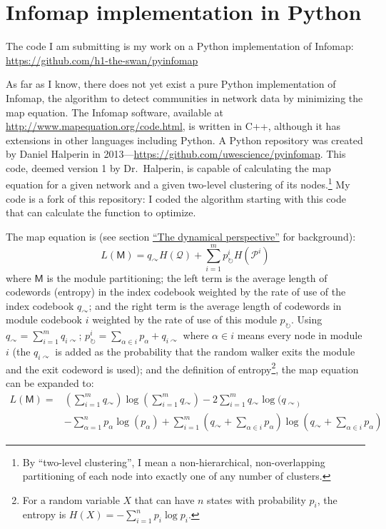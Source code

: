 \hypertarget{pyinfomap}{\section{Infomap implementation in
Python}\label{pyinfomap}}

\protect\hyperlink{pyinfomap}{}

The code I am submitting is my work on a Python implementation of
Infomap: \url{https://github.com/h1-the-swan/pyinfomap}

As far as I know, there does not yet exist a pure Python implementation
of Infomap, the algorithm to detect communities in network data by
minimizing the map equation. The Infomap software, available at
\url{http://www.mapequation.org/code.html}, is written in C++, although
it has extensions in other languages including Python. A Python
repository was created by Daniel Halperin in
2013---\url{https://github.com/uwescience/pyinfomap}. This code, deemed
version 1 by Dr.~Halperin, is capable of calculating the map equation
for a given network and a given two-level clustering of its
nodes.\footnote{By ``two-level clustering'', I mean a non-hierarchical,
  non-overlapping partitioning of each node into exactly one of any
  number of clusters.} My code is a fork of this repository: I coded the
algorithm starting with this code that can calculate the function to
optimize.

The map equation is (see section
\protect\hyperlink{the-dynamical-perspective}{``The dynamical
perspective''} for background):
\[L(\mathsf{M}) = q_{\curvearrowright} H(\mathcal{Q}) + \sum_{i=1}^{m}{p_{\circlearrowright}^{i} H(\mathcal{P}^i)}\]
where \(\mathsf{M}\) is the module partitioning; the left term is the
average length of codewords (entropy) in the index codebook weighted by
the rate of use of the index codebook \(q_{\curvearrowright}\); and the
right term is the average length of codewords in module codebook \(i\)
weighted by the rate of use of this module \(p_{\circlearrowright}\).
Using \(q_{\curvearrowright} = \sum_{i=1}^{m}{q_{i\curvearrowright}}\);
\(p_{\circlearrowright}^{i} = \sum_{\alpha \in i}{p_{\alpha}} + q_{i\curvearrowright}\)
where \(\alpha \in i\) means every node in module \(i\) (the
\(q_{i\curvearrowright}\) is added as the probability that the random
walker exits the module and the exit codeword is used); and the
definition of entropy\footnote{For a random variable \(X\) that can have
  \(n\) states with probability \(p_i\), the entropy is
  \(H(X) = -\sum_{i=1}^{n}{p_i\log{p_i}}\).}, the map equation can be
expanded to: \[
\begin{aligned}
L(\mathsf{M}) = &\left(\sum_{i=1}^{m}{q_{\curvearrowright}}\right) 
                                        \log \left(\sum_{i=1}^{m}{q_{\curvearrowright}}\right)
                                        - 2 \sum_{i=1}^{m}{q_{\curvearrowright}} \log (q_{\curvearrowright)} \\
                                &- \sum_{\alpha=1}^{n}{p_{\alpha} \log(p_\alpha)}
                                        + \sum_{i=1}^{m}{\left(q_{\curvearrowright} + \sum_{\alpha \in i}{p_{\alpha}}\right) \log \left(q_{\curvearrowright} + \sum_{\alpha \in i}{p_{\alpha}}\right)}
\end{aligned}
\]

